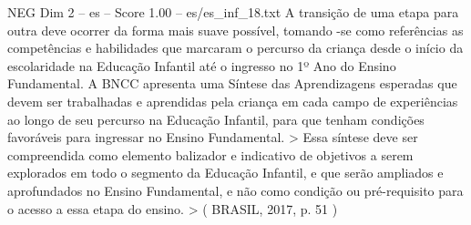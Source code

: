 \begin{textsample}{NEG Dim 2 – es – Score 1.00 – es/es\_inf\_18.txt}
A transição de uma etapa para outra deve ocorrer da forma mais suave possível, tomando -se como referências as competências e habilidades que marcaram o percurso da criança desde o início da escolaridade na Educação Infantil até o ingresso no 1º Ano do Ensino Fundamental.
A BNCC apresenta uma Síntese das Aprendizagens esperadas que devem ser trabalhadas e aprendidas pela criança em cada campo de experiências ao longo de seu percurso na Educação Infantil, para que tenham condições favoráveis para ingressar no Ensino Fundamental. > Essa síntese deve ser compreendida como elemento balizador e indicativo de objetivos a serem explorados em todo o segmento da Educação Infantil, e que serão ampliados e aprofundados no Ensino Fundamental, e não como condição ou pré-requisito para o acesso a essa etapa do ensino. > ( BRASIL, 2017, p. 51 )

\end{textsample}
